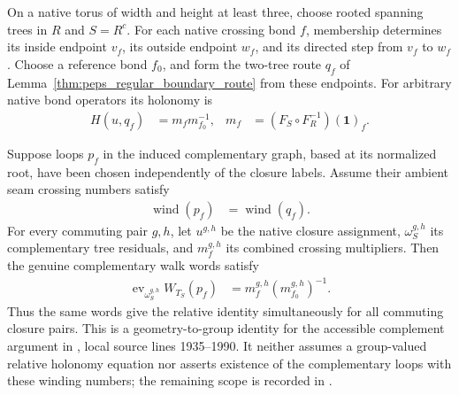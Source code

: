 \begin{lemma}%
    \label{thm:peps_torus_complement_cycle_words}
    \leanok
    On a native torus of width and height at least three, choose rooted
    spanning trees in $R$ and $S=R^c$. For each native crossing bond $f$,
    membership determines its inside endpoint $v_f$, its outside endpoint
    $w_f$, and its directed step from $v_f$ to $w_f$. Choose a reference
    bond $f_0$, and form the two-tree route $q_f$ of
    Lemma~\ref{thm:peps_regular_boundary_route} from these endpoints.
    For arbitrary native bond operators its holonomy is
    \begin{align}
        H(u,q_f) & =m_fm_{f_0}^{-1},
                 & m_f               & =(F_S\circ F_R^{-1})(\mathbf 1)_f.
    \end{align}

    Suppose loops $p_f$ in the induced complementary graph,
    based at its normalized root, have been chosen independently of the
    closure labels. Assume their ambient seam crossing numbers satisfy
    \begin{align}
        \operatorname{wind}(p_f) & =\operatorname{wind}(q_f).
    \end{align}
    For every commuting pair $g,h$, let $u^{g,h}$ be the native
    closure assignment, $\omega_S^{g,h}$ its complementary tree residuals,
    and $m_f^{g,h}$ its combined crossing multipliers. Then the genuine
    complementary walk words satisfy
    \begin{align}
        \operatorname{ev}_{\omega_S^{g,h}}W_{T_S}(p_f)
         & =m_f^{g,h}(m_{f_0}^{g,h})^{-1}.
    \end{align}
    Thus the same words give the relative identity simultaneously for
    all commuting closure pairs. This is a geometry-to-group identity
    for the accessible complement argument in
    \cite[Theorem~6.9]{Schuch2010PEPS}, local source lines 1935--1990.
    It neither assumes a group-valued relative holonomy equation nor
    asserts existence of the complementary loops with these winding numbers;
    the remaining scope is recorded in
    \cite{gap:rmp_peps_quantum_double_g_isometry}.
\end{lemma}

